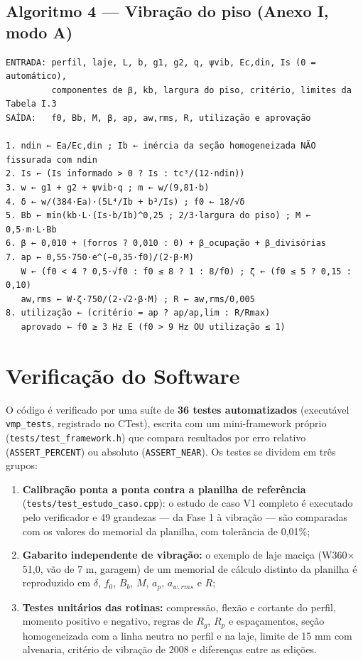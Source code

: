 \subsection{Algoritmo 4 --- Vibração do piso (Anexo I, modo A)}
\begin{lstlisting}[caption={Vibração do piso (Anexo I, modo A)},label={lst:alg-vibracao}]
ENTRADA: perfil, laje, L, b, g1, g2, q, ψvib, Ec,din, Is (0 = automático),
         componentes de β, kb, largura do piso, critério, limites da Tabela I.3
SAÍDA:   f0, Bb, M, β, ap, aw,rms, R, utilização e aprovação

1. ndin ← Ea/Ec,din ; Ib ← inércia da seção homogeneizada NÃO fissurada com ndin
2. Is ← (Is informado > 0 ? Is : tc³/(12·ndin))
3. w ← g1 + g2 + ψvib·q ; m ← w/(9,81·b)
4. δ ← w/(384·Ea)·(5L⁴/Ib + b³/Is) ; f0 ← 18/√δ
5. Bb ← min(kb·L·(Is·b/Ib)^0,25 ; 2/3·largura do piso) ; M ← 0,5·m·L·Bb
6. β ← 0,010 + (forros ? 0,010 : 0) + β_ocupação + β_divisórias
7. ap ← 0,55·750·e^(−0,35·f0)/(2·β·M)
   W ← (f0 < 4 ? 0,5·√f0 : f0 ≤ 8 ? 1 : 8/f0) ; ζ ← (f0 ≤ 5 ? 0,15 : 0,10)
   aw,rms ← W·ζ·750/(2·√2·β·M) ; R ← aw,rms/0,005
8. utilização ← (critério = ap ? ap/ap,lim : R/Rmax)
   aprovado ← f0 ≥ 3 Hz E (f0 > 9 Hz OU utilização ≤ 1)
\end{lstlisting}

\section{Verificação do Software}\label{sec:3.4}
O código é verificado por uma suíte de \textbf{36 testes automatizados} (executável \texttt{vmp\_tests}, registrado no CTest), escrita com um mini-framework próprio (\texttt{tests/test\_framework.h}) que compara resultados por erro relativo (\texttt{ASSERT\_PERCENT}) ou absoluto (\texttt{ASSERT\_NEAR}). Os testes se dividem em três grupos:
\begin{enumerate}
\item \textbf{Calibração ponta a ponta contra a planilha de referência} (\texttt{tests/test\_estudo\_caso.cpp}): o estudo de caso V1 completo é executado pelo verificador e 49 grandezas --- da Fase 1 à vibração --- são comparadas com os valores do memorial da planilha, com tolerância de 0,01\%;
\item \textbf{Gabarito independente de vibração:} o exemplo de laje maciça (W360\ensuremath{\times}51,0, vão de 7 m, garagem) de um memorial de cálculo distinto da planilha é reproduzido em $\delta$, $f_0$, $B_b$, $M$, $a_p$, $a_{w,rms}$ e $R$;
\item \textbf{Testes unitários das rotinas:} compressão, flexão e cortante do perfil, momento positivo e negativo, regras de $R_g$, $R_p$ e espaçamentos, seção homogeneizada com a linha neutra no perfil e na laje, limite de 15 mm com alvenaria, critério de vibração de 2008 e diferenças entre as edições.
\end{enumerate}

